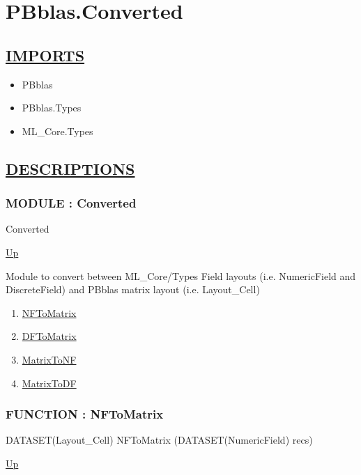 \chapter*{PBblas.Converted}
\hypertarget{ecldoc:toc:PBblas.Converted}{}

\section*{\underline{IMPORTS}}
\begin{itemize}
\item PBblas
\item PBblas.Types
\item ML\_Core.Types
\end{itemize}

\section*{\underline{DESCRIPTIONS}}
\subsection*{MODULE : Converted}
\hypertarget{ecldoc:PBblas.Converted}{}
\begin{minipage}[t]{\textwidth}
\begin{flushleft}
 Converted 
\end{flushleft}
\end{minipage}
\hyperlink{ecldoc:toc:PBblas}{Up}

\par
Module to convert between ML\_Core/Types Field layouts (i.e. NumericField and DiscreteField) and PBblas matrix layout (i.e. Layout\_Cell)
\par
\begin{enumerate}
\item \hyperlink{ecldoc:pbblas.converted.nftomatrix}{NFToMatrix}
\item \hyperlink{ecldoc:pbblas.converted.dftomatrix}{DFToMatrix}
\item \hyperlink{ecldoc:pbblas.converted.matrixtonf}{MatrixToNF}
\item \hyperlink{ecldoc:pbblas.converted.matrixtodf}{MatrixToDF}
\end{enumerate}
\subsection*{FUNCTION : NFToMatrix}
\hypertarget{ecldoc:pbblas.converted.nftomatrix}{}
\begin{minipage}[t]{\textwidth}
\begin{flushleft}
DATASET(Layout\_Cell) NFToMatrix (DATASET(NumericField) recs)
\end{flushleft}
\end{minipage}
\hyperlink{ecldoc:PBblas.Converted}{Up}

